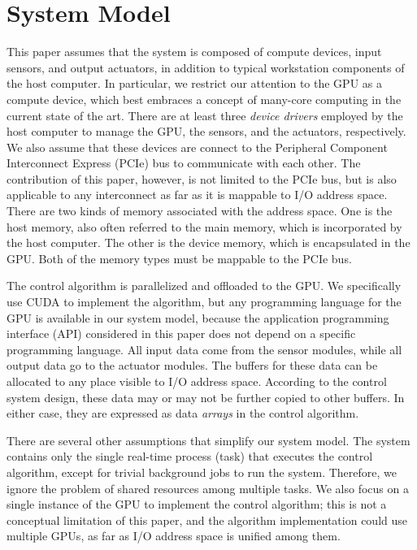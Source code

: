 \section{System Model}
\label{sec:system_model}

This paper assumes that the system is composed of compute devices, input
sensors, and output actuators, in addition to typical workstation
components of the host computer.
In particular, we restrict our attention to the GPU as a compute device,
which best embraces a concept of many-core computing in the current
state of the art.
There are at least three \textit{device drivers} employed by the host
computer to manage the GPU, the sensors, and the actuators,
respectively.
We also assume that these devices are connect to the Peripheral
Component Interconnect Express (PCIe) bus to communicate with each
other.
The contribution of this paper, however, is not limited to the PCIe bus,
but is also applicable to any interconnect as far as it is mappable to
I/O address space.
There are two kinds of memory associated with the address space.
One is the host memory, also often referred to the main memory, which is
incorporated by the host computer.
The other is the device memory, which is encapsulated in the GPU.
Both of the memory types must be mappable to the PCIe bus.

The control algorithm is parallelized and offloaded to the GPU.
We specifically use CUDA to implement the algorithm, but any programming
language for the GPU is available in our system model, because the
application programming interface (API) considered in this paper does
not depend on a specific programming language.
All input data come from the sensor modules, while all output data go to
the actuator modules.
The buffers for these data can be allocated to any place visible to I/O
address space.
According to the control system design, these data may or may not be
further copied to other buffers.
In either case, they are expressed as data \textit{arrays} in the
control algorithm.

There are several other assumptions that simplify our system model.
The system contains only the single real-time process (task) that
executes the control algorithm, except for trivial background jobs to
run the system.
Therefore, we ignore the problem of shared resources among multiple
tasks.
We also focus on a single instance of the GPU to implement the control
algorithm; this is not a conceptual limitation of this paper, and the
algorithm implementation could use multiple GPUs, as far as I/O address
space is unified among them.